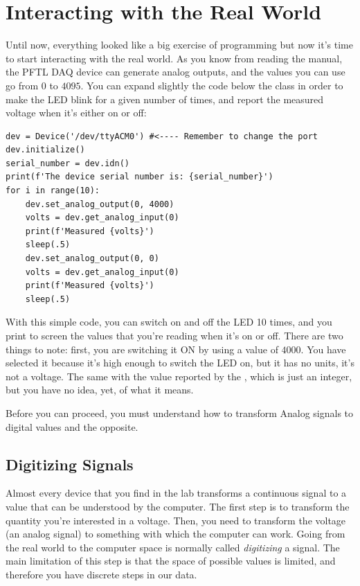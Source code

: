 \section{Interacting with the Real World}\label{sec:doing-something-in-theemph}
Until now, everything looked like a big exercise of programming but now it's time to start interacting with the real world. As you know from reading the manual, the {PFTL DAQ} device can generate analog outputs, and the values you can use go from $0$ to $4095$. You can expand slightly the code below the class in order to make the LED blink for a given number of times, and report the measured voltage when it's either on or off:

\begin{verbatim}
dev = Device('/dev/ttyACM0') #<---- Remember to change the port
dev.initialize()
serial_number = dev.idn()
print(f'The device serial number is: {serial_number}')
for i in range(10):
    dev.set_analog_output(0, 4000)
    volts = dev.get_analog_input(0)
    print(f'Measured {volts}')
    sleep(.5)
    dev.set_analog_output(0, 0)
    volts = dev.get_analog_input(0)
    print(f'Measured {volts}')
    sleep(.5)
\end{verbatim}

With this simple code, you can switch on and off the LED 10 times, and you print to screen the values that you're reading when it's on or off. There are two things to note: first, you are switching it ON by using a value of $4000$. You have selected it because it's high enough to switch the LED on, but it has no units, it's not a voltage. The same with the value reported by the , which is just an integer, but you have no idea, yet, of what it means.

Before you can proceed, you must understand how to transform Analog signals to digital values and the opposite.

\subsection{Digitizing Signals}\label{subsec:adc-dca}
Almost every device that you find in the lab transforms a continuous signal to a value that can be understood by the computer. The first step is to transform the quantity you're interested in a voltage. Then, you need to transform the voltage (an analog signal) to something with which the computer can work. Going from the real world to the computer space is normally called \emph{digitizing} a signal. The main limitation of this step is that the space of possible values is limited, and therefore you have discrete steps in our data.

